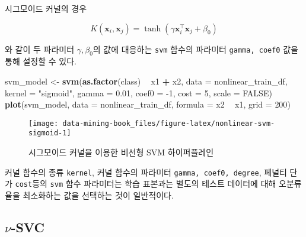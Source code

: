 \documentclass[]{book}
\newenvironment{Shaded}{\begin{snugshade}}{\end{snugshade}}
\newcommand{\DataTypeTok}[1]{\textcolor[rgb]{0.13,0.29,0.53}{#1}}
\newcommand{\DecValTok}[1]{\textcolor[rgb]{0.00,0.00,0.81}{#1}}
\newcommand{\FloatTok}[1]{\textcolor[rgb]{0.00,0.00,0.81}{#1}}
\newcommand{\KeywordTok}[1]{\textcolor[rgb]{0.13,0.29,0.53}{\textbf{#1}}}
\newcommand{\NormalTok}[1]{#1}
\newcommand{\OperatorTok}[1]{\textcolor[rgb]{0.81,0.36,0.00}{\textbf{#1}}}
\newcommand{\OtherTok}[1]{\textcolor[rgb]{0.56,0.35,0.01}{#1}}
\newcommand{\StringTok}[1]{\textcolor[rgb]{0.31,0.60,0.02}{#1}}
\begin{document}
시그모이드 커널의 경우

\begin{equation*}
K(\mathbf{x}_i, \mathbf{x}_j) = \tanh \left(\gamma \mathbf{x}_i^\top \mathbf{x}_j + \beta_0 \right)
\end{equation*}

와 같이 두 파라미터 \(\gamma, \beta_0\)의 값에 대응하는 \texttt{svm} 함수의 파라미터 \texttt{gamma,\ coef0} 값을 통해 설정할 수 있다.

\begin{Shaded}
\begin{Highlighting}[]
\NormalTok{svm_model <-}\StringTok{ }\KeywordTok{svm}\NormalTok{(}\KeywordTok{as.factor}\NormalTok{(class) }\OperatorTok{~}\StringTok{ }\NormalTok{x1 }\OperatorTok{+}\StringTok{ }\NormalTok{x2, }\DataTypeTok{data =}\NormalTok{ nonlinear_train_df, }
                 \DataTypeTok{kernel =} \StringTok{"sigmoid"}\NormalTok{, }\DataTypeTok{gamma =} \FloatTok{0.01}\NormalTok{, }\DataTypeTok{coef0 =} \DecValTok{-1}\NormalTok{,}
                 \DataTypeTok{cost =} \DecValTok{5}\NormalTok{, }\DataTypeTok{scale =} \OtherTok{FALSE}\NormalTok{)}
\KeywordTok{plot}\NormalTok{(svm_model, }\DataTypeTok{data =}\NormalTok{ nonlinear_train_df, }\DataTypeTok{formula =}\NormalTok{ x2 }\OperatorTok{~}\StringTok{ }\NormalTok{x1, }\DataTypeTok{grid =} \DecValTok{200}\NormalTok{)}
\end{Highlighting}
\end{Shaded}

\begin{figure}

{\centering \texttt{[image: data-mining-book\_files/figure-latex/nonlinear-svm-sigmoid-1]} 

}

\caption{시그모이드 커널을 이용한 비선형 SVM 하이퍼플레인}\label{fig:nonlinear-svm-sigmoid}
\end{figure}

커널 함수의 종류 \texttt{kernel}, 커널 함수의 파라미터 \texttt{gamma,\ coef0,\ degree}, 페널티 단가 \texttt{cost}등의 \texttt{svm} 함수 파라미터는 학습 표본과는 별도의 테스트 데이터에 대해 오분류율을 최소화하는 값을 선택하는 것이 일반적이다.

\hypertarget{svm-nu-classification}{%
\subsection{\texorpdfstring{\(\nu\)-SVC}{\textbackslash{}nu-SVC}}\label{svm-nu-classification}}
\end{document}
